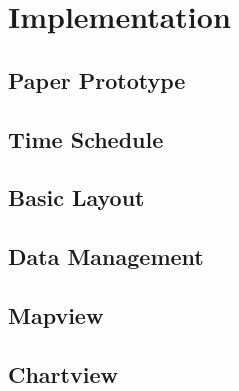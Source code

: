 \chapter{Implementation}
\label{cha:implementation}
%

\newpage
\section{Paper Prototype}
\label{sec:paper_prototype}


\newpage
\section{Time Schedule}
\label{subsec:time_schedule}

\newpage
\section{Basic Layout}

\newpage
\section{Data Management}

\newpage
\section{Mapview}

\newpage
\section{Chartview}

\newpage

